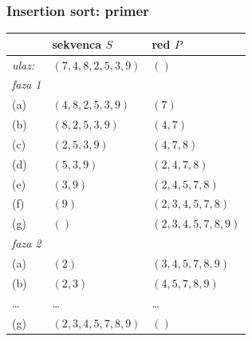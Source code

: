 \documentclass[compress,aspectratio=169]{beamer}
\begin{document}
\begin{frame}
  \frametitle{Insertion sort: primer}
  \begin{center}
    \begin{tabular}{lll}
       & \textbf{sekvenca $S$} & \textbf{red $P$} \\ \hline\hline
      \textit{ulaz:} & $(7,4,8,2,5,3,9)$ & $()$ \\ \hline
      \textit{faza 1} &  &   \\ 
      (a) & $(4,8,2,5,3,9)$ & $(7)$ \\ 
      (b) & $(8,2,5,3,9)$ & $(4,7)$ \\ 
      (c) & $(2,5,3,9)$ & $(4,7,8)$ \\ 
      (d) & $(5,3,9)$ & $(2,4,7,8)$ \\ 
      (e) & $(3,9)$ & $(2,4,5,7,8)$ \\ 
      (f) & $(9)$ & $(2,3,4,5,7,8)$ \\ 
      (g) & $()$ & $(2,3,4,5,7,8,9)$ \\ \hline 
      \textit{faza 2} &  &   \\ 
      (a) & $(2)$ & $(3,4,5,7,8,9)$ \\
      (b) & $(2,3)$ & $(4,5,7,8,9)$ \\
      \ldots & \ldots & \ldots \\ 
      (g) & $(2,3,4,5,7,8,9)$ & $()$
    \end{tabular}
  \end{center}
\end{frame}
\end{document}
